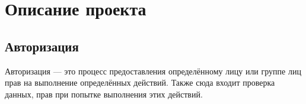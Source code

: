 \section{Описание проекта}
\subsection{Авторизация}
Авторизация --- это процесс предоставления определённому лицу или группе лиц прав на выполнение определённых действий. Также сюда входит проверка данных, прав при попытке выполнения этих действий.


\clearpage
